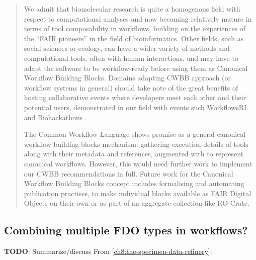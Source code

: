 \begin{quotation}
  We admit that biomolecular research is quite a homogenous field with
  respect to computational analyses and now becoming relatively mature in
  terms of tool composability in workflows, building on the experiences of
  the ``FAIR pioneers'' in the field of bioinformatics.
  Other fields, such
  as social sciences or ecology, can have a wider variety of methods and
  computational tools, often with human interactions, and may have to
  adapt the software to be workflow-ready \cite{ch6-37} before using them as
  Canonical Workflow Building Blocks.
  Domains adapting CWBB approach (or
  workflow systems in general) should take note of the great benefits of
  hosting collaborative events where developers meet each other and their
  potential users, demonstrated in our field with events such WorkflowsRI
  \cite{ch6-39} and Biohackathons \cite{ch6-40}.

  The Common Workflow Language shows promise as a general canonical
  workflow building blocks mechanism: gathering execution details of tools
  along with their metadata and references, augmented with
   to represent canonical workflows.
  However, this would need
  further work to implement our CWBB recommendations in full.
  Future work
  for the Canonical Workflow Building Blocks concept includes formalising
  and automating publication practises, to make individual blocks
  available as FAIR Digital Objects on their own or as part of an
  aggregate collection like RO-Crate.
\end{quotation}


\subsection{Combining multiple FDO types in workflows?}

\textbf{TODO}: Summarize/discuss 
From \vref{ch8:the-specimen-data-refinery}:

